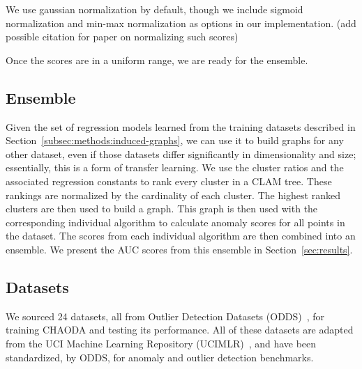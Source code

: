 We use gaussian normalization by default, though we include sigmoid normalization and min-max normalization as options in our implementation. (add possible citation for paper on normalizing such scores)


Once the scores are in a uniform range, we are ready for the ensemble.


\subsection{Ensemble}\label{subsec:methods:ensemble}
Given the set of regression models learned from the training datasets described in Section~\ref{subsec:methods:induced-graphs}, we can use it to build graphs for any other dataset, even if those datasets differ significantly in dimensionality and size; essentially, this is a form of transfer learning.
We use the cluster ratios and the associated regression constants to rank every cluster in a CLAM tree.
These rankings are normalized by the cardinality of each cluster.
The highest ranked clusters are then used to build a graph.
This graph is then used with the corresponding individual algorithm to calculate anomaly scores for all points in the dataset.
The scores from each individual algorithm are then combined into an ensemble.
We present the AUC scores from this ensemble in Section~\ref{sec:results}.



\subsection{Datasets}\label{subsec:methods:datasets}

We sourced 24 datasets, all from Outlier Detection Datasets (ODDS)~\cite{rayana2016odds}, for training CHAODA and testing its performance.
All of these datasets are adapted from the UCI Machine Learning Repository (UCIMLR)~\cite{UCIMLR}, and have been standardized, by ODDS, for anomaly and outlier detection benchmarks.




